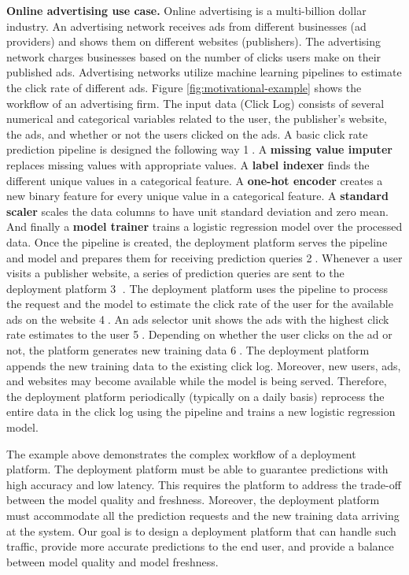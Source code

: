 \textbf{Online advertising use case.} 
Online advertising is a multi-billion dollar industry.
An advertising network receives ads from different businesses (ad providers) and shows them on different websites (publishers).
The advertising network charges businesses based on the number of clicks users make on their published ads.
Advertising networks utilize machine learning pipelines to estimate the click rate of different ads.
Figure \ref{fig:motivational-example} shows the workflow of an advertising firm.
The input data (Click Log) consists of several numerical and categorical variables related to the user, the publisher's website, the ads, and whether or not the users clicked on the ads.
A basic click rate prediction pipeline is designed the following way \textcircled{1}. 
A \textbf{missing value imputer} replaces missing values with appropriate values.
A \textbf{label indexer} finds the different unique values in a categorical feature. 
A \textbf{one-hot encoder} creates a new binary feature for every unique value in a categorical feature.
A \textbf{standard scaler} scales the data columns to have unit standard deviation and zero mean.
And finally a \textbf{model trainer} trains a logistic regression model over the processed data.
Once the pipeline is created, the deployment platform serves the pipeline and model and prepares them for receiving prediction queries \textcircled{2}.
Whenever a user visits a publisher website, a series of prediction queries are sent to the deployment platform \textcircled{3} .
The deployment platform uses the pipeline to process the request and the model to estimate the click rate of the user for the available ads on the website \textcircled{4}.
An ads selector unit shows the ads with the highest click rate estimates to the user \textcircled{5}.
Depending on whether the user clicks on the ad or not, the platform generates new training data \textcircled{6}.
The deployment platform appends the new training data to the existing click log.
Moreover, new users, ads, and websites may become available while the model is being served.
Therefore, the deployment platform periodically (typically on a daily basis) reprocess the entire data in the click log using the pipeline and trains a new logistic regression model.

The example above demonstrates the complex workflow of a deployment platform.
The deployment platform must be able to guarantee predictions with high accuracy and low latency.
This requires the platform to address the trade-off between the model quality and freshness.
Moreover, the deployment platform must accommodate all the prediction requests and the new training data arriving at the system. 
Our goal is to design a deployment platform that can handle such traffic, provide more accurate predictions to the end user, and provide a balance between model quality and model freshness.

